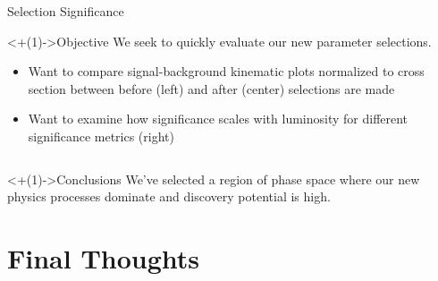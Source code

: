 \documentclass[handout]{beamer}
\begin{document}
\begin{frame}{Selection Significance}
    \begin{block}<+(1)->{Objective}
        We seek to quickly evaluate our new parameter selections.
        \begin{itemize}[<+(1)->]
            \item Want to compare signal-background kinematic plots normalized to cross section between before (left) and after (center) selections are made
            \item Want to examine how significance scales with luminosity for different significance metrics (right)
        \end{itemize}
    \end{block}
    
    \bigskip
    
    \begin{columns}
    \end{columns}
    \begin{block}<+(1)->{Conclusions}
            We've selected a region of phase space where our new physics processes dominate and discovery potential is high.
    \end{block}
\end{frame}

%
%
\section{Final Thoughts}
\end{document}
